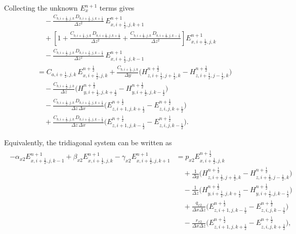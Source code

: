 \documentclass{article}
\numberwithin{equation}{section}
\numberwithin{figure}{section}
\begin{document}
Collecting the unknown $E_{x}^{n+1}$ terms gives
\begin{equation}
    \begin{aligned}
         & \quad -\frac{C_{b,i+\tfrac12,j,k}\,D_{b,i+\tfrac12,j,k+\tfrac12}}{\Delta z^2}\, E_{x,i+\tfrac12,j,k+1}^{n+1}                                                                                     \\
         & \quad + \left[1+\frac{C_{b,i+\tfrac12,j,k}\,D_{b,i+\tfrac12,j,k+\tfrac12}}{\Delta z^2} +\frac{C_{b,i+\tfrac12,j,k}\,D_{b,i+\tfrac12,j,k-\tfrac12}}{\Delta z^2}\right] E_{x,i+\tfrac12,j,k}^{n+1} \\
         & \quad - \frac{C_{b,i+\tfrac12,j,k}\,D_{b,i+\tfrac12,j,k-\tfrac12}}{\Delta z^2}\, E_{x,i+\tfrac12,j,k-1}^{n+1}                                                                                    \\
         & = C_{a,i+\tfrac12,j,k}\, E_{x,i+\tfrac12,j,k}^{n+\frac12} + \frac{C_{b,i+\tfrac12,j,k}}{\Delta y} \Big(H_{z,i+\tfrac12,j+\tfrac12,k}^{n+\frac12}-H_{z,i+\tfrac12,j-\tfrac12,k}^{n+\frac12}\Big)  \\
         & \quad - \frac{C_{b,i+\tfrac12,j,k}}{\Delta z} \Big(H_{y,i+\tfrac12,j,k+\tfrac12}^{n+\frac12}-H_{y,i+\tfrac12,j,k-\tfrac12}^{n+\frac12}\Big)                                                      \\
         & \quad - \frac{C_{b,i+\tfrac12,j,k}\,D_{b,i+\tfrac12,j,k+\tfrac12}}{\Delta z\,\Delta x} \Big(E_{z,i+1,j,k+\tfrac12}^{n+\frac12}-E_{z,i,j,k+\tfrac12}^{n+\frac12}\Big)                             \\
         & \quad + \frac{C_{b,i+\tfrac12,j,k}\,D_{b,i+\tfrac12,j,k-\tfrac12}}{\Delta z\,\Delta x} \Big(E_{z,i+1,j,k-\tfrac12}^{n+\frac12}-E_{z,i,j,k-\tfrac12}^{n+\frac12}\Big).
    \end{aligned}
\end{equation}

Equivalently, the tridiagonal system can be written as
\begin{align}
    \begin{split}
        -\alpha_{x2}E_{x,i+\tfrac12,j,k-1}^{n+1} + \beta_{x2}E_{x,i+\tfrac12,j,k}^{n+1} - \gamma_{x2}E_{x,i+\tfrac12,j,k+1}^{n+1}
         & = p_{x2}E_{x,i+\tfrac12,j,k}^{n+\frac12}                                                                               \\
         & \quad +\frac{1}{\Delta y}\Big(H_{z,i+\tfrac12,j+\tfrac12,k}^{n+\frac12}-H_{z,i+\tfrac12,j-\tfrac12,k}^{n+\frac12}\Big) \\
         & \quad -\frac{1}{\Delta z}\Big(H_{y,i+\tfrac12,j,k+\tfrac12}^{n+\frac12}-H_{y,i+\tfrac12,j,k-\tfrac12}^{n+\frac12}\Big) \\
         & \quad +\frac{q_{x2}}{\Delta x\Delta z}\Big(E_{z,i+1,j,k-\tfrac12}^{n+\frac12}-E_{z,i,j,k-\tfrac12}^{n+\frac12}\Big)    \\
         & \quad -\frac{r_{x2}}{\Delta x\Delta z}\Big(E_{z,i+1,j,k+\tfrac12}^{n+\frac12}-E_{z,i,j,k+\tfrac12}^{n+\frac12}\Big),
    \end{split}
    \label{eq:second-e-ex-adi-tridiagonal}
\end{align}
\end{document}
